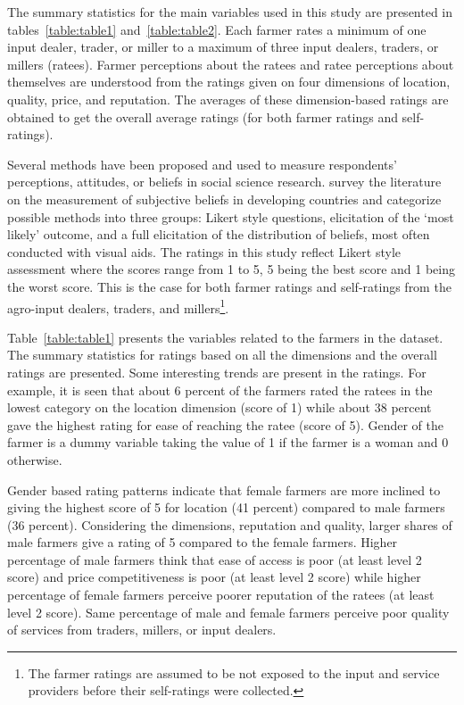 \documentclass[12pt,english]{article}\usepackage[]{graphicx}\usepackage[]{color}
\begin{document}
\begin{onehalfspace}
The summary statistics for the main variables used in this study are
presented in tables~\ref{table:table1} and~\ref{table:table2}. Each
farmer rates a minimum of one input dealer, trader, or miller to a
maximum of three input dealers, traders, or millers (ratees). Farmer
perceptions about the ratees and ratee perceptions about themselves
are understood from the ratings given on four dimensions of location,
quality, price, and reputation. The averages of these dimension-based
ratings are obtained to get the overall average ratings (for both
farmer ratings and self-ratings). 

Several methods have been proposed and used to measure respondents\textquoteright{}
perceptions, attitudes, or beliefs in social science research. \citet{Delavande2011}
survey the literature on the measurement of subjective beliefs in
developing countries and categorize possible methods into three groups:
Likert style questions, elicitation of the \textquoteleft most likely\textquoteright{}
outcome, and a full elicitation of the distribution of beliefs, most
often conducted with visual aids. The ratings in this study reflect
Likert style assessment where the scores range from 1 to 5, 5 being
the best score and 1 being the worst score. This is the case for both
farmer ratings and self-ratings from the agro-input dealers, traders,
and millers\footnote{The farmer ratings are assumed to be not exposed to the input and
service providers before their self-ratings were collected.}. 
\end{onehalfspace}

Table~\ref{table:table1} presents the variables related to the farmers
in the dataset. The summary statistics for ratings based on all the
dimensions and the overall ratings are presented. Some interesting
trends are present in the ratings. For example, it is seen that about
6
percent of the farmers rated the ratees in the lowest category on
the location dimension (score of 1) while about 38
percent gave the highest rating for ease of reaching the ratee (score
of 5). Gender of the farmer is a dummy variable taking the value of
1 if the farmer is a woman and 0 otherwise. 

Gender based rating patterns indicate that female farmers are more
inclined to giving the highest score of 5 for location (41
percent) compared to male farmers (36
percent). Considering the dimensions, reputation and quality, larger
shares of male farmers give a rating of 5 compared to the female farmers.
Higher percentage of male farmers think that ease of access is poor
(at least level 2 score) and price competitiveness is poor (at least
level 2 score) while higher percentage of female farmers perceive
poorer reputation of the ratees (at least level 2 score). Same percentage
of male and female farmers perceive poor quality of services from
traders, millers, or input dealers.
\end{document}
